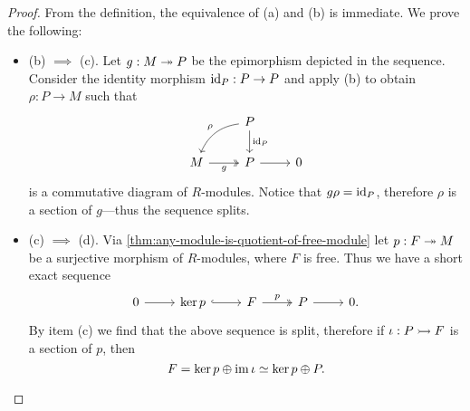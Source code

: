 \begin{proof}
From the definition, the equivalence of (a) and (b) is immediate. We prove the
following:
\begin{itemize}\setlength\itemsep{0em}
\item (b) \(\implies\) (c). Let \(g: M \twoheadrightarrow P\) be the epimorphism depicted in
  the sequence. Consider the identity morphism \(\operatorname{id}_P: P \to P\) and apply (b)
  to obtain \(\rho: P \to M\) such that
  \[
  \begin{tikzcd}
  &P \ar[d, "\Id_P"] \ar[ld, "\rho"', bend right] & \\
  M \ar[r, "g"', two heads] &P \ar[r] &0
  \end{tikzcd}
  \]
  is a commutative diagram of \(R\)-modules. Notice that \(g \rho = \operatorname{id}_P\),
  therefore \(\rho\) is a section of \(g\)---thus the sequence splits.

\item (c) \(\implies\) (d). Via
  \cref{thm:any-module-is-quotient-of-free-module} let \(p: F \twoheadrightarrow M\) be a
  surjective morphism of \(R\)-modules, where \(F\) is free. Thus we have a
  short exact sequence
  \[
  \begin{tikzcd}
  0 \ar[r] &\ker p \ar[r, hook] &F \ar[r, "p", two heads] &P \ar[r] &0.
  \end{tikzcd}
  \]
  By item (c) we find that the above sequence is split, therefore if \(\iota: P
  \rightarrowtail F\) is a section of \(p\), then
  \[
  F = \ker p \oplus \operatorname{im} \iota \simeq \ker p \oplus P.
  \]


\end{itemize}
\end{proof}
